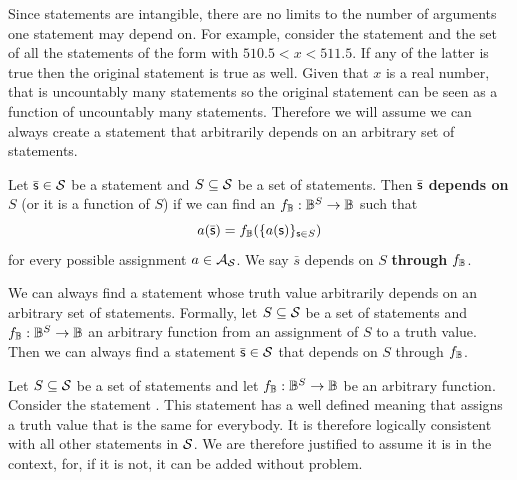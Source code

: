 \documentclass[11pt,letterpaper,fleqn]{memoir} %
\begin{document}
Since statements are intangible, there are no limits to the number of arguments one statement may depend on. For example, consider the statement  and the set of all the statements of the form  with $510.5 < x < 511.5$. If any of the latter is true then the original statement is true as well. Given that $x$ is a real number, that is uncountably many statements so the original statement can be seen as a function of uncountably many statements. Therefore we will assume we can always create a statement that arbitrarily depends on an arbitrary set of statements.

\begin{mathSection}
	\begin{defn}\label{def_dependence}
	Let $\bar{\mathsf{s}} \in \mathcal{S}$ be a statement and $S \subseteq \mathcal{S}$ be a set of statements. Then $\bar{\mathsf{s}}$ \textbf{depends on} $S$ (or it is a function of $S$)  if we can find an $f_{\mathbb{B}} : \mathbb{B}^S \to \mathbb{B}$ such that
	$$a(\bar{\mathsf{s}}) = f_{\mathbb{B}} (\{a(\mathsf{s})\}_{\mathsf{s} \in S})$$
	for every possible assignment $a \in \mathcal{A}_{\mathcal{S}}$. We say $\bar{s}$ depends on $S$ \textbf{through} $f_{\mathbb{B}}$.
\end{defn}

	\begin{axiom}\label{ax_functions_of_statement}
		We can always find a statement whose truth value arbitrarily depends on an arbitrary set of statements. Formally, let $S \subseteq \mathcal{S}$ be a set of statements and $f_{\mathbb{B}} : \mathbb{B}^S \to \mathbb{B}$ an arbitrary function from an assignment of $S$ to a truth value. Then we can always find a statement $\bar{\mathsf{s}} \in \mathcal{S}$ that depends on $S$ through $f_{\mathbb{B}}$.
	\end{axiom}
\begin{justification}
	Let $S \subseteq \mathcal{S}$ be a set of statements and let $f_{\mathbb{B}} : \mathbb{B}^S \to \mathbb{B}$ be an arbitrary function. Consider the statement . This statement has a well defined meaning that assigns a truth value that is the same for everybody. It is therefore logically consistent with all other statements in $\mathcal{S}$. We are therefore justified to assume it is in the context, for, if it is not, it can be added without problem. 
\end{justification}


\end{mathSection}
\end{document}
